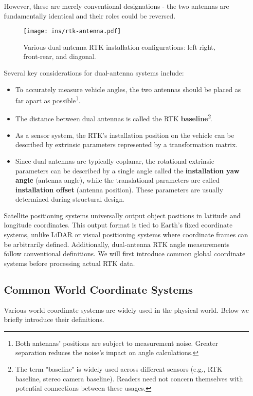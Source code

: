 However, these are merely conventional designations - the two antennas are fundamentally identical and their roles could be reversed.

\begin{figure}
	\centering
	\texttt{[image: ins/rtk-antenna.pdf]}
	\caption{Various dual-antenna RTK installation configurations: left-right, front-rear, and diagonal.}
	\label{fig:rtk-antenna}
\end{figure}

Several key considerations for dual-antenna systems include:
\begin{itemize}
	\item To accurately measure vehicle angles, the two antennas should be placed as far apart as possible\footnote{Both antennas' positions are subject to measurement noise. Greater separation reduces the noise's impact on angle calculations.}.
	\item The distance between dual antennas is called the RTK \textbf{baseline}\footnote{The term "baseline" is widely used across different sensors (e.g., RTK baseline, stereo camera baseline). Readers need not concern themselves with potential connections between these usages.}.
	\item As a sensor system, the RTK's installation position on the vehicle can be described by extrinsic parameters represented by a transformation matrix.
	\item Since dual antennas are typically coplanar, the rotational extrinsic parameters can be described by a single angle called the \textbf{installation yaw angle} (antenna angle), while the translational parameters are called \textbf{installation offset} (antenna position). These parameters are usually determined during structural design.
\end{itemize}

Satellite positioning systems universally output object positions in latitude and longitude coordinates. This output format is tied to Earth's fixed coordinate systems, unlike LiDAR or visual positioning systems where coordinate frames can be arbitrarily defined. Additionally, dual-antenna RTK angle measurements follow conventional definitions. We will first introduce common global coordinate systems before processing actual RTK data.
\subsection{Common World Coordinate Systems}
Various world coordinate systems are widely used in the physical world. Below we briefly introduce their definitions.

